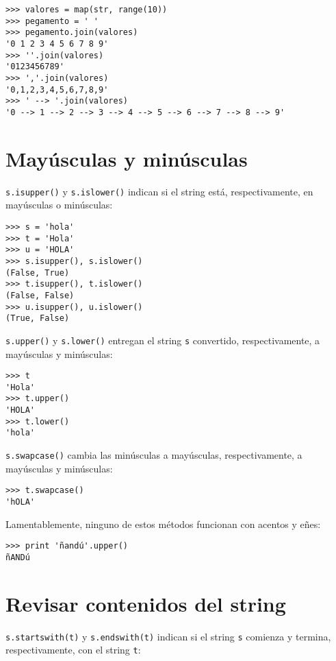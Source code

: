 \begin{lstlisting}
>>> valores = map(str, range(10))
>>> pegamento = ' '
>>> pegamento.join(valores)
'0 1 2 3 4 5 6 7 8 9'
>>> ''.join(valores)
'0123456789'
>>> ','.join(valores)
'0,1,2,3,4,5,6,7,8,9'
>>> ' --> '.join(valores)
'0 --> 1 --> 2 --> 3 --> 4 --> 5 --> 6 --> 7 --> 8 --> 9'
\end{lstlisting}

\section{Mayúsculas y minúsculas}

\lstinline!s.isupper()! y \lstinline!s.islower()! indican si el string
está, respectivamente, en mayúsculas o minúsculas:

\begin{lstlisting}
>>> s = 'hola'
>>> t = 'Hola'
>>> u = 'HOLA'
>>> s.isupper(), s.islower()
(False, True)
>>> t.isupper(), t.islower()
(False, False)
>>> u.isupper(), u.islower()
(True, False)
\end{lstlisting}

\lstinline!s.upper()! y \lstinline!s.lower()! entregan el string
\lstinline!s! convertido, respectivamente, a mayúsculas y minúsculas:

\begin{lstlisting}
>>> t
'Hola'
>>> t.upper()
'HOLA'
>>> t.lower()
'hola'
\end{lstlisting}

\lstinline!s.swapcase()! cambia las minúsculas a mayúsculas,
respectivamente, a mayúsculas y minúsculas:

\begin{lstlisting}
>>> t.swapcase()
'hOLA'
\end{lstlisting}

Lamentablemente, ninguno de estos métodos funcionan con acentos y eñes:

\begin{lstlisting}
>>> print 'ñandú'.upper()
ñANDú
\end{lstlisting}

\section{Revisar contenidos del string}

\lstinline!s.startswith(t)! y \lstinline!s.endswith(t)! indican si el
string \lstinline!s! comienza y termina, respectivamente, con el string
\lstinline!t!:

